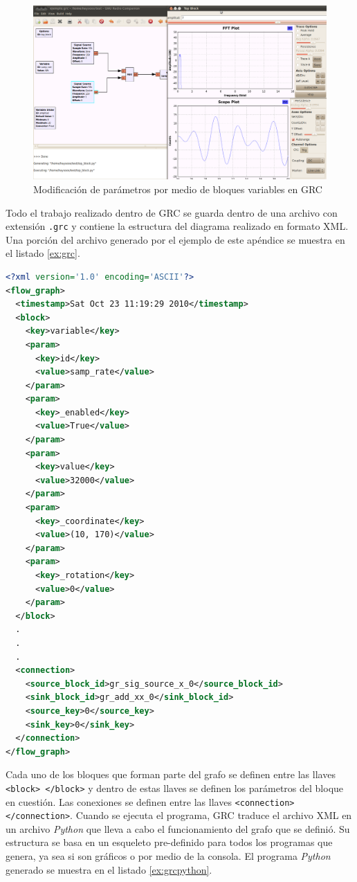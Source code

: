 \begin{figure}[htp]
  \centering
  \includegraphics[width=5.5in]{figs/grc9}
  \vspace{0.1in}
  \caption{Modificaci\'on de par\'ametros por medio de bloques variables en GRC}
  \label{fig:vargrc}
\end{figure}

Todo el trabajo realizado dentro de GRC se guarda dentro de una archivo con extensi\'on \verb|.grc| y contiene la estructura del
diagrama realizado en formato XML. Una porci\'on del archivo generado por el ejemplo de este ap\'endice se muestra en el listado
\ref{ex:grc}.

\begin{lstlisting}[float, language=XML, label=ex:grc, caption={C\'odigo XML de un proyecto de GRC}]
<?xml version='1.0' encoding='ASCII'?>
<flow_graph>
  <timestamp>Sat Oct 23 11:19:29 2010</timestamp>
  <block>
    <key>variable</key>
    <param>
      <key>id</key>
      <value>samp_rate</value>
    </param>
    <param>
      <key>_enabled</key>
      <value>True</value>
    </param>
    <param>
      <key>value</key>
      <value>32000</value>
    </param>
    <param>
      <key>_coordinate</key>
      <value>(10, 170)</value>
    </param>
    <param>
      <key>_rotation</key>
      <value>0</value>
    </param>
  </block>
  .
  .
  .
  <connection>
    <source_block_id>gr_sig_source_x_0</source_block_id>
    <sink_block_id>gr_add_xx_0</sink_block_id>
    <source_key>0</source_key>
    <sink_key>0</sink_key>
  </connection>
</flow_graph>
\end{lstlisting}

Cada uno de los bloques que forman parte del grafo se definen entre las llaves \verb|<block> </block>| y dentro de estas llaves se
definen los par\'ametros del bloque en cuesti\'on. Las conexiones se definen entre las llaves \verb|<connection> </connection>|.
Cuando se ejecuta el programa, GRC traduce el archivo XML en un archivo \emph{Python} que lleva a cabo el funcionamiento del grafo
que se defini\'o. Su estructura se basa en un esqueleto pre-definido para todos los programas que genera, ya sea si son gr\'aficos o por
medio de la consola. El programa \emph{Python} generado se muestra en el listado \ref{ex:grcpython}.

